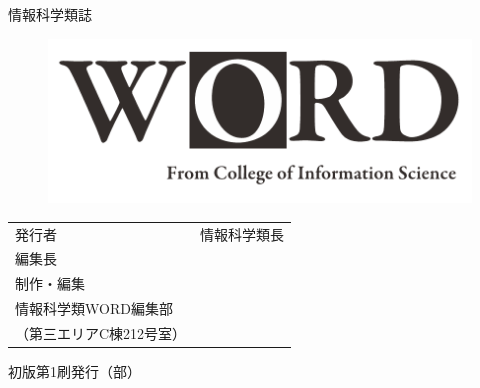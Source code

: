\documentclass[../../main]{subfiles}
\begin{document}
\thispagestyle{empty}

\makeatletter
\newcommand*{\circulation}[1]{\gdef\@circulation{#1}}
\makeatother
\pagestyle{empty}
\setlength{\parindent}{0pt}
\newcommand*{\vstretch}[1]{\vspace*{\stretch{#1}}}



{\Huge 情報科学類誌}
\begin{figure}[h]
  \centering
  \includegraphics[width=\textwidth]{wordlogo.pdf}
\end{figure}

\vstretch{3}

\makeatletter
\begin{center}
  {\HUGE \@title}
\end{center}

\vstretch{4}

\begin{framed}
  \centering
  \Huge
  \begin{tabular}{ll}
    発行者 & 情報科学類長 \\
    編集長 & \@author{} \\
    制作・編集 & \shortstack[l]{%
                  筑波大学情報学群 \\%
                  情報科学類WORD編集部 \\%
                  （第三エリアC棟212号室）}
  \end{tabular}

  \vspace*{0.3em}

  {\LARGE \@date{}\hspace{1em}初版第1刷発行\hfill{}（\@circulation{}部）}

  \vspace*{0.2em}
\end{framed}
\makeatother
\end{document}
